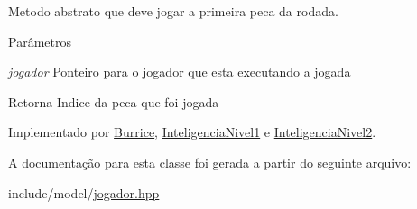 Metodo abstrato que deve jogar a primeira peca da rodada. 


\begin{DoxyParams}{Parâmetros}
\item[{\em jogador}]Ponteiro para o jogador que esta executando a jogada \end{DoxyParams}
\begin{DoxyReturn}{Retorna}
Indice da peca que foi jogada 
\end{DoxyReturn}


Implementado por \hyperlink{classBurrice_a6ca38eb99bc6cf3d106b915bad981178}{Burrice}, \hyperlink{classInteligenciaNivel1_adef4d79445d1b1e5537cf386923d2a4e}{InteligenciaNivel1} e \hyperlink{classInteligenciaNivel2_a2e30feca2d1071705638d33f825ef207}{InteligenciaNivel2}.



A documentação para esta classe foi gerada a partir do seguinte arquivo:\begin{DoxyCompactItemize}
\item 
include/model/\hyperlink{jogador_8hpp}{jogador.hpp}\end{DoxyCompactItemize}

